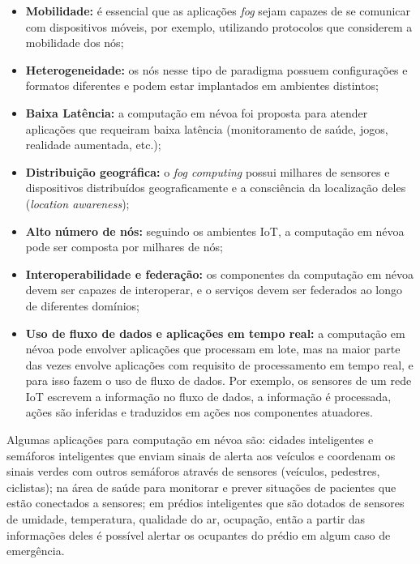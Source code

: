 \begin{itemize}

    \item \textbf{Mobilidade:} é essencial que as aplicações \emph{fog} sejam
    capazes de se comunicar com dispositivos móveis, por exemplo, utilizando
    protocolos que considerem a mobilidade dos nós;

    \item \textbf{Heterogeneidade:} os nós nesse tipo de paradigma possuem
    configurações e formatos diferentes e podem estar implantados em ambientes
    distintos;

    \item \textbf{Baixa Latência:} a computação em névoa foi proposta para
    atender aplicações que requeiram baixa latência (monitoramento de saúde,
    jogos, realidade aumentada, etc.);

    \item \textbf{Distribuição geográfica:} o \emph{fog computing} possui
    milhares de sensores e dispositivos distribuídos geograficamente e a
    consciência da localização deles (\emph{location awareness});

    \item \textbf{Alto número de nós:} seguindo os ambientes IoT, a computação
    em névoa pode ser composta por milhares de nós;

    \item \textbf{Interoperabilidade e federação:} os componentes da computação
    em névoa devem ser capazes de interoperar, e o serviços devem ser federados
    ao longo de diferentes domínios;

    \item \textbf{Uso de fluxo de dados e aplicações em tempo real:} a
    computação em névoa pode envolver aplicações que processam em lote, mas na
    maior parte das vezes envolve aplicações com requisito de processamento em
    tempo real, e para isso fazem o uso de fluxo de dados. Por exemplo, os
    sensores de um rede IoT escrevem a informação no fluxo de dados, a
    informação é processada, ações são inferidas e traduzidos em
    ações nos componentes atuadores.

\end{itemize}

Algumas aplicações para computação em névoa são: cidades inteligentes e
semáforos inteligentes que enviam sinais de alerta aos veículos e coordenam os
sinais verdes com outros semáforos através de sensores (veículos, pedestres,
ciclistas); na área de saúde para monitorar e prever situações de pacientes que
estão conectados a sensores; em prédios inteligentes que são dotados de sensores
de umidade, temperatura, qualidade do ar, ocupação, então a partir das
informações deles é possível alertar os ocupantes do prédio em algum caso de
emergência.

